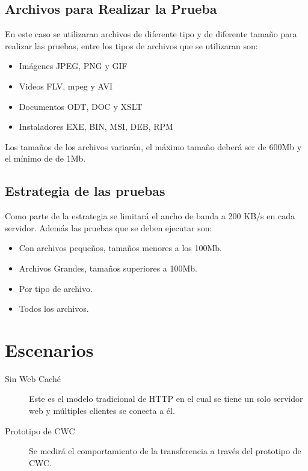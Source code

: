 \subsection{Archivos para Realizar la Prueba}
En este caso se utilizaran archivos de diferente tipo y de diferente tamaño para realizar las pruebas, entre los tipos de archivos que se utilizaran son:

\begin{itemize}
\item Imágenes JPEG, PNG y GIF
\item Videos FLV, mpeg y AVI
\item Documentos ODT, DOC y XSLT
\item Instaladores EXE, BIN, MSI, DEB, RPM
\end{itemize}

Los tamaños de los archivos variarán, el máximo tamaño deberá ser de 600Mb y el mínimo de de 1Mb.

\subsection{Estrategia de las pruebas}
Como parte de la estrategia se limitará el ancho de banda a 200 KB/s en cada servidor. Además las pruebas que se deben ejecutar son:

\begin{itemize}
\item Con archivos pequeños, tamaños menores a los 100Mb.
\item Archivos Grandes, tamaños superiores a 100Mb.
\item Por tipo de archivo.
\item Todos los archivos.
\end{itemize}

\section{Escenarios}

\begin{description}
\item[Sin Web Caché] Este es el modelo tradicional de HTTP en el cual se tiene un solo servidor web y múltiples clientes se conecta a él.

\item [Prototipo de CWC] Se medirá el comportamiento de la transferencia a través del prototipo de CWC.
\end{description}
